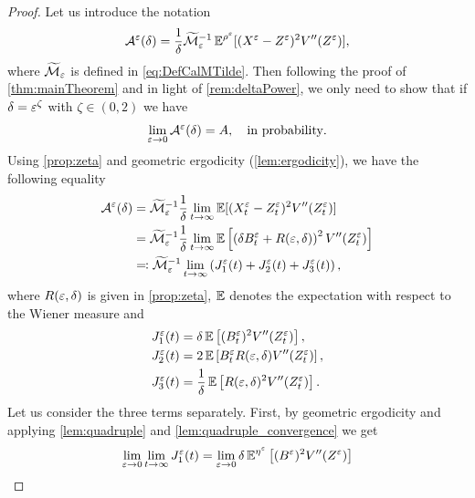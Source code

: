 \documentclass[review,onefignum,onetabnum]{siamonline190516}
\begin{document}
\begin{proof}
	Let us introduce the notation
	\begin{equation}
	\mathcal A^\varepsilon(\delta) = \frac1\delta \widetilde{\mathcal M}_\varepsilon^{-1} \operatorname{\mathbb{E}}^{\rho^\varepsilon}[(X^\varepsilon - Z^\varepsilon)^2 V''(Z^\varepsilon)],
	\end{equation}
	where $\widetilde{\mathcal M}_\varepsilon$ is defined in \eqref{eq:DefCalMTilde}.	Then following the proof of \cref{thm:mainTheorem} and in light of \cref{rem:deltaPower}, we only need to show that if $\delta = \varepsilon^\zeta$ with $\zeta \in (0,2)$ we have
	\begin{equation}
	\lim_{\varepsilon \to 0} \mathcal A^\varepsilon(\delta) = A, \quad \text{in probability}.
	\end{equation}
	Using \cref{prop:zeta} and geometric ergodicity (\cref{lem:ergodicity}), we have the following equality
	\begin{equation}
	\begin{aligned}
	\mathcal A^\varepsilon(\delta) &= \widetilde{\mathcal M}_\varepsilon^{-1} \frac1\delta \lim_{t \to \infty} \operatorname{\mathbb{E}} [(X_t^\varepsilon - Z_t^\varepsilon)^2 V''(Z_t^\varepsilon)] \\
	&= \widetilde{\mathcal M}_\varepsilon^{-1} \frac1\delta \lim_{t \to \infty} \operatorname{\mathbb{E}} \left[ \left( \delta B_t^\varepsilon + R(\varepsilon,\delta) \right)^2 V''(Z_t^\varepsilon) \right] \\
	&\eqqcolon \widetilde{\mathcal M}_\varepsilon^{-1} \lim_{t \to \infty} \left( J_1^\varepsilon(t) + J_2^\varepsilon(t) + J_3^\varepsilon(t) \right),
	\end{aligned}
	\end{equation}
	where $R(\varepsilon, \delta)$ is given in \cref{prop:zeta}, $\operatorname{\mathbb{E}}$ denotes the expectation with respect to the Wiener measure and
	\begin{equation}
	\begin{aligned}
	J_1^\varepsilon(t) &= \delta \operatorname{\mathbb{E}} \left[ (B_t^\varepsilon)^2 V''(Z_t^\varepsilon) \right], \\
	J_2^\varepsilon(t) &= 2 \operatorname{\mathbb{E}} \left[ B_t^\varepsilon R(\varepsilon,\delta) V''(Z_t^\varepsilon) \right], \\
	J_3^\varepsilon(t) &= \frac1\delta \operatorname{\mathbb{E}}\left[ R(\varepsilon,\delta)^2 V''(Z_t^\varepsilon) \right].
	\end{aligned}
	\end{equation}
	Let us consider the three terms separately. First, by geometric ergodicity and applying \cref{lem:quadruple} and \cref{lem:quadruple_convergence} we get
	\begin{equation}
	\begin{aligned}
	\lim_{\epl \to 0} \lim_{t \to \infty} J_1^\epl(t) &= \lim_{\epl \to 0}\delta \E^{\eta^\epl} \left[ (B^\epl)^2 V''(Z^\epl) \right] \\

\end{aligned}
\end{equation}
\end{proof}
\end{document}
